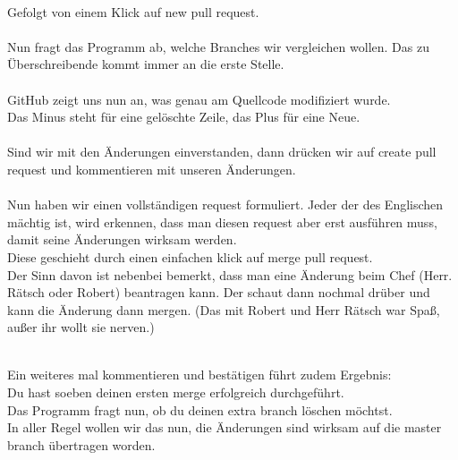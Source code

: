 \documentclass[a4paper,10pt,DIV11,oneside]{scrartcl}
\begin{document}
\\

Gefolgt von einem Klick auf new pull request.\\

\\

Nun fragt das Programm ab, welche Branches wir vergleichen wollen. Das zu Überschreibende kommt immer an die erste Stelle. \\

\\

GitHub zeigt uns nun an, was genau am Quellcode modifiziert wurde.\\
Das Minus steht für eine gelöschte Zeile, das Plus für eine Neue.\\

\\

Sind wir mit den Änderungen einverstanden, dann drücken wir auf create pull request und kommentieren mit unseren Änderungen.\\

\\

Nun haben wir einen vollständigen request formuliert. Jeder der des Englischen mächtig ist, wird erkennen, dass man diesen request aber erst ausführen muss, damit seine Änderungen wirksam werden.\\
Diese geschieht durch einen einfachen klick auf merge pull request.\\
Der Sinn davon ist nebenbei bemerkt, dass man eine Änderung beim Chef (Herr. Rätsch oder Robert) beantragen kann. Der schaut dann nochmal drüber und kann die Änderung dann mergen. (Das mit Robert und Herr Rätsch war Spaß, außer ihr wollt sie nerven.)

\\

Ein weiteres mal kommentieren und bestätigen führt zudem Ergebnis:\\
Du hast soeben deinen ersten merge erfolgreich durchgeführt.\\
Das Programm fragt nun, ob du deinen extra branch löschen möchtst.\\
In aller Regel wollen wir das nun, die Änderungen sind wirksam auf die master branch übertragen worden.
\newpage
\end{document}
